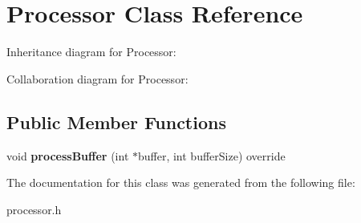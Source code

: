 \hypertarget{classProcessor}{}\section{Processor Class Reference}
\label{classProcessor}


Inheritance diagram for Processor\+:


Collaboration diagram for Processor\+:
\subsection*{Public Member Functions}
\begin{DoxyCompactItemize}
\item 
\mbox{\label{classProcessor_ac09be199cfb1a1f6d278bde651821b70}} 
void {\bfseries process\+Buffer} (int $\ast$buffer, int buffer\+Size) override
\end{DoxyCompactItemize}


The documentation for this class was generated from the following file\+:\begin{DoxyCompactItemize}
\item 
processor.\+h\end{DoxyCompactItemize}
